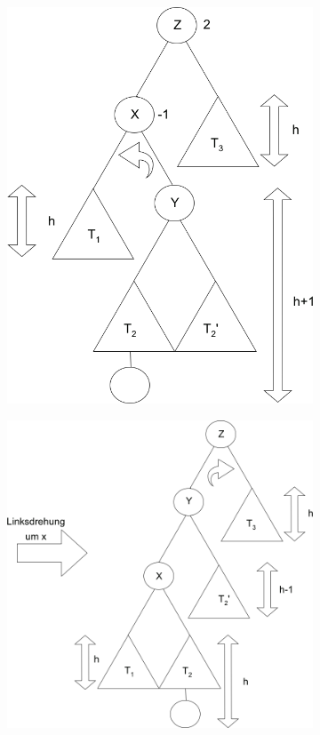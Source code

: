 \begin{figure}
	\vspace*{-40pt}
	\begin{subfigure}[H]{0.3\textwidth}
		\includegraphics[width=\linewidth]{11/Grafik/img5_doppelRotation_2.png}
	\end{subfigure}
	\begin{subfigure}[H]{0.3\textwidth}
			\includegraphics[width=\linewidth]{11/Grafik/img6_doppelRotation_3.png}

\end{subfigure}
\end{figure}
